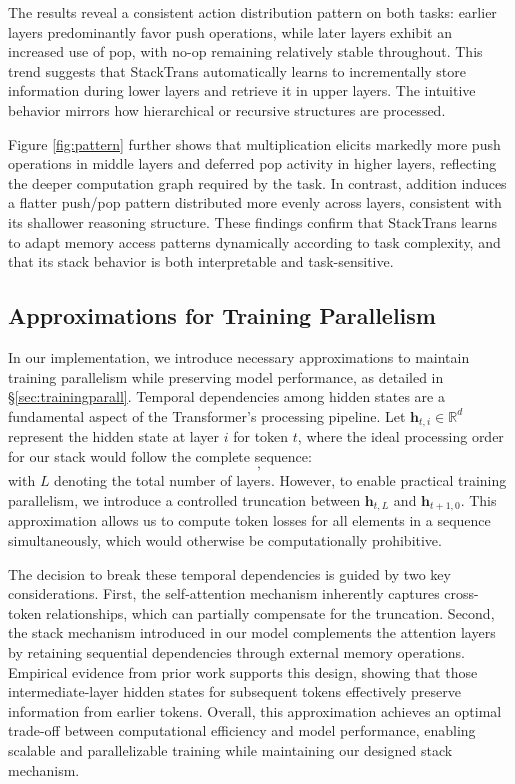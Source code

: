 \documentclass{article}
\DeclareRobustCommand{\method}{{\sc StackTrans}\xspace}
\begin{document}
The results reveal a consistent action distribution pattern on both tasks: earlier layers predominantly favor push operations, while later layers exhibit an increased use of pop, with no-op remaining relatively stable throughout. This trend suggests that \method automatically learns to incrementally store information during lower layers and retrieve it in upper layers. The intuitive behavior mirrors how hierarchical or recursive structures are processed.

Figure \ref{fig:pattern} further shows that multiplication elicits markedly more push operations in middle layers and deferred pop activity in higher layers, reflecting the deeper computation graph required by the task. 
In contrast, addition induces a flatter push/pop pattern distributed more evenly across layers, consistent with its shallower reasoning structure.
These findings confirm that \method learns to adapt memory access patterns dynamically according to task complexity, and that its stack behavior is both interpretable and task-sensitive. 





\subsection{Approximations for Training Parallelism}
\label{sec:approximation}


In our implementation, we introduce necessary approximations to maintain training parallelism while preserving model performance, as detailed in \S\ref{sec:trainingparall}. 
Temporal dependencies among hidden states are a fundamental aspect of the Transformer's processing pipeline. 
Let $\mathbf{h}_{t,i} \in \mathbb{R}^d$ represent the hidden state at layer $i$ for token $t$, where the ideal processing order for our stack would follow the complete sequence:
\begin{equation}
    [\mathbf{h}_{t_0,0}, \mathbf{h}_{t_0,1}, \ldots, \mathbf{h}_{t_0,L}, \mathbf{h}_{t_1,0}, \ldots],
\end{equation}
with $L$ denoting the total number of layers. 
However, to enable practical training parallelism, we introduce a controlled truncation between $\mathbf{h}_{t,L}$ and $\mathbf{h}_{t+1,0}$. 
This approximation allows us to compute token losses for all elements in a sequence simultaneously, which would otherwise be computationally prohibitive.

The decision to break these temporal dependencies is guided by two key considerations. First, the self-attention mechanism inherently captures cross-token relationships, which can partially compensate for the truncation. 
Second, the stack mechanism introduced in our model complements the attention layers by retaining sequential dependencies through external memory operations. 
Empirical evidence from prior work \citep{think2talk} supports this design, showing that those intermediate-layer hidden states for subsequent tokens effectively preserve information from earlier tokens.
Overall, this approximation achieves an optimal trade-off between computational efficiency and model performance, enabling scalable and parallelizable training while maintaining our designed stack mechanism.
\end{document}
